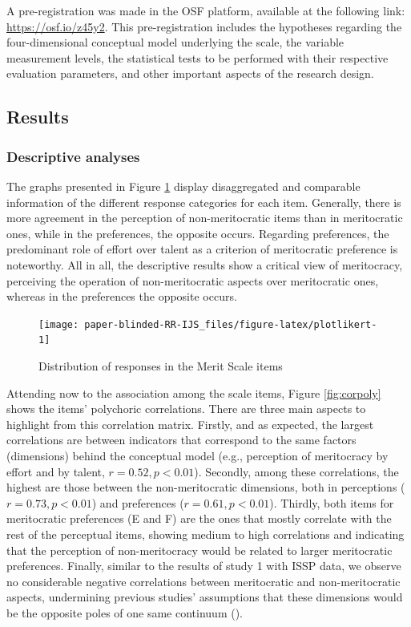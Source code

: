 \documentclass[
  10pt,
  a4paper,
]{article}
\begin{document}
A pre-registration was made in the OSF platform, available at the following link: \href{https://osf.io/z45y2/?view_only=adcd496887f2471597b1d6ffb46e492d}{https://osf.io/z45y2}. This pre-registration includes the hypotheses regarding the four-dimensional conceptual model underlying the scale, the variable measurement levels, the statistical tests to be performed with their respective evaluation parameters, and other important aspects of the research design.

\subsection{Results}\label{results-1}

\subsubsection{Descriptive analyses}\label{descriptive-analyses-1}

The graphs presented in Figure \ref{fig:plotlikert} display disaggregated and comparable information of the different response categories for each item. Generally, there is more agreement in the perception of non-meritocratic items than in meritocratic ones, while in the preferences, the opposite occurs. Regarding preferences, the predominant role of effort over talent as a criterion of meritocratic preference is noteworthy. All in all, the descriptive results show a critical view of meritocracy, perceiving the operation of non-meritocratic aspects over meritocratic ones, whereas in the preferences the opposite occurs.

\begin{figure}[H]

{\centering \texttt{[image: paper-blinded-RR-IJS\_files/figure-latex/plotlikert-1]} 

}

\caption{Distribution of responses in the Merit Scale items}\label{fig:plotlikert}
\end{figure}

Attending now to the association among the scale items, Figure \ref{fig:corpoly} shows the items' polychoric correlations. There are three main aspects to highlight from this correlation matrix. Firstly, and as expected, the largest correlations are between indicators that correspond to the same factors (dimensions) behind the conceptual model (e.g., perception of meritocracy by effort and by talent, \(r=0.52,p<0.01\)). Secondly, among these correlations, the highest are those between the non-meritocratic dimensions, both in perceptions (\(r=0.73,p<0.01\)) and preferences (\(r=0.61,p<0.01\)). Thirdly, both items for meritocratic preferences (E and F) are the ones that mostly correlate with the rest of the perceptual items, showing medium to high correlations and indicating that the perception of non-meritocracy would be related to larger meritocratic preferences. Finally, similar to the results of study 1 with ISSP data, we observe no considerable negative correlations between meritocratic and non-meritocratic aspects, undermining previous studies' assumptions that these dimensions would be the opposite poles of one same continuum ().
\end{document}
